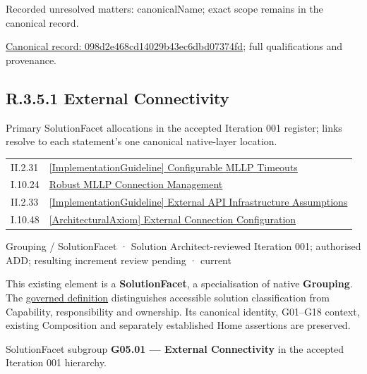 {\small Recorded unresolved matters: canonicalName; exact scope remains in the canonical record.}\par
{\footnotesize \href{../../../../../../../continuum/grouping/098d2e468cd14029b43ec6dbd07374fd.md}{Canonical record: 098d2e468cd14029b43ec6dbd07374fd}; full qualifications and provenance.}\par
\subsection*{R.3.5.1 External Connectivity}
\label{navigation:R.3.5.1}

Primary SolutionFacet allocations in the accepted Iteration 001 register; links resolve to each statement’s one canonical native-layer location.\par
\begin{longtable}{p{.22\linewidth}p{.73\linewidth}}
II.2.31 & \hyperref[element:267142b7a01a49c686458b9fc1c8d7b2]{[ImplementationGuideline] Configurable MLLP Timeouts} \\
I.10.24 & \hyperref[element:e7b7d94a94194ef28a12051a550d3f3f]{Robust MLLP Connection Management} \\
II.2.33 & \hyperref[element:a0c7aa62c0ff498c91dcd6af011170ce]{[ImplementationGuideline] External API Infrastructure Assumptions} \\
I.10.48 & \hyperref[element:f24e63c49135411bbfbc06f9385aeea5]{[ArchitecturalAxiom] External Connection Configuration} \\
\end{longtable}
\label{element:0b9e18356e9e4dcca51007f03f7b81b4}
{\small Grouping / SolutionFacet · Solution Architect-reviewed Iteration 001; authorised ADD; resulting increment review pending · current}\par

This existing element is a \textbf{SolutionFacet}, a specialisation of native
\textbf{Grouping}. The \href{\detokenize{../../../../../../../governance/continuum-representation.md#solutionfacet-classification--1119-candidate}}{governed definition}
distinguishes accessible solution classification from Capability, responsibility
and ownership. Its canonical identity, G01–G18 context, existing Composition
and separately established Home assertions are preserved.



SolutionFacet subgroup \textbf{G05.01 — External Connectivity} in the accepted Iteration 001 hierarchy.



